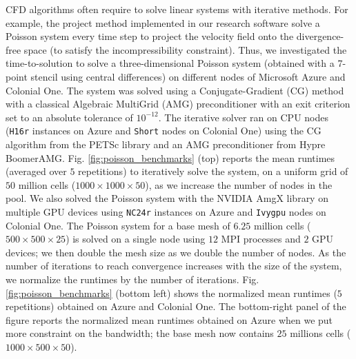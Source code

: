 \documentclass[10pt,journal,compsoc]{IEEEtran}
\begin{document}
CFD algorithms often require to solve linear systems with iterative methods.
For example, the project method implemented in our research software solve a Poisson system every time step to project the velocity field onto the divergence-free space (to satisfy the incompressibility constraint).
Thus, we investigated the time-to-solution to solve a three-dimensional Poisson system (obtained with a 7-point stencil using central differences) on different nodes of Microsoft Azure and Colonial One.
The system was solved using a Conjugate-Gradient (CG) method with a classical Algebraic MultiGrid (AMG) preconditioner with an exit criterion set to an absolute tolerance of $10^{-12}$.
The iterative solver ran on CPU nodes (\texttt{H16r} instances on Azure and \texttt{Short} nodes on Colonial One) using the CG algorithm from the PETSc library\cite{balay_et_al_2018} and an AMG preconditioner from Hypre BoomerAMG.
Fig. \ref{fig:poisson_benchmarks} (top) reports the mean runtimes (averaged over $5$ repetitions) to iteratively solve the system, on a uniform grid of $50$ million cells ($1000 \times 1000 \times 50$), as we increase the number of nodes in the pool.
We also solved the Poisson system with the NVIDIA AmgX library on multiple GPU devices using \texttt{NC24r} instances on Azure and \texttt{Ivygpu} nodes on Colonial One.
The Poisson system for a base mesh of $6.25$ million cells ($500 \times 500 \times 25$) is solved on a single node using $12$ MPI processes and $2$ GPU devices; we then double the mesh size as we double the number of nodes.
As the number of iterations to reach convergence increases with the size of the system, we normalize the runtimes by the number of iterations.
Fig. \ref{fig:poisson_benchmarks} (bottom left) shows the normalized mean runtimes ($5$ repetitions) obtained on Azure and Colonial One.
The bottom-right panel of the figure reports the normalized mean runtimes obtained on Azure when we put more constraint on the bandwidth; the base mesh now contains $25$ millions cells ($1000 \times 500 \times 50$).
\end{document}
